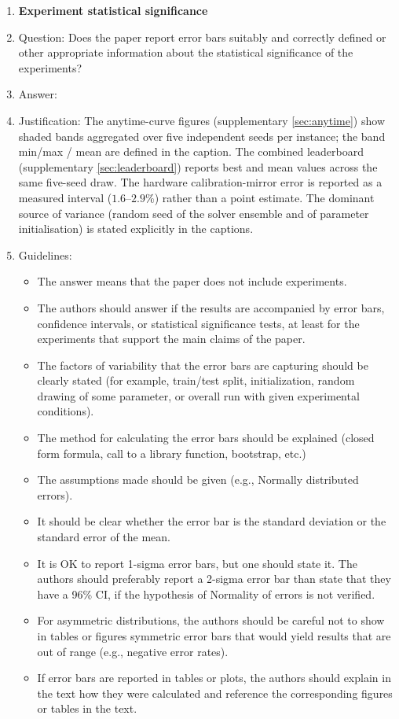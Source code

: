 \begin{enumerate}
\item {\bf Experiment statistical significance}
    \item[] Question: Does the paper report error bars suitably and correctly defined or other appropriate information about the statistical significance of the experiments?
    \item[] Answer: \answerYes{} %
    \item[] Justification: The anytime-curve figures (supplementary
        \cref{sec:anytime}) show shaded bands aggregated over five
        independent seeds per instance; the band min/max / mean are
        defined in the caption. The combined leaderboard (supplementary
        \cref{sec:leaderboard}) reports best and mean values across the
        same five-seed draw. The hardware calibration-mirror error is
        reported as a measured interval ($1.6$--$2.9\%$) rather than a
        point estimate. The dominant source of variance (random seed of
        the solver ensemble and of \QAOA parameter initialisation) is
        stated explicitly in the captions.
    \item[] Guidelines:
    \begin{itemize}
        \item The answer \answerNA{} means that the paper does not include experiments.
        \item The authors should answer \answerYes{} if the results are accompanied by error bars, confidence intervals, or statistical significance tests, at least for the experiments that support the main claims of the paper.
        \item The factors of variability that the error bars are capturing should be clearly stated (for example, train/test split, initialization, random drawing of some parameter, or overall run with given experimental conditions).
        \item The method for calculating the error bars should be explained (closed form formula, call to a library function, bootstrap, etc.)
        \item The assumptions made should be given (e.g., Normally distributed errors).
        \item It should be clear whether the error bar is the standard deviation or the standard error of the mean.
        \item It is OK to report 1-sigma error bars, but one should state it. The authors should preferably report a 2-sigma error bar than state that they have a 96\% CI, if the hypothesis of Normality of errors is not verified.
        \item For asymmetric distributions, the authors should be careful not to show in tables or figures symmetric error bars that would yield results that are out of range (e.g., negative error rates).
        \item If error bars are reported in tables or plots, the authors should explain in the text how they were calculated and reference the corresponding figures or tables in the text.
    \end{itemize}


\end{enumerate}
